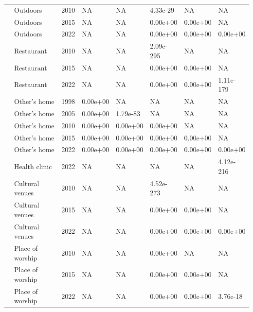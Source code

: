 \documentclass[preprint, 3p,
authoryear]{elsarticle} %
\begin{document}
\begin{table}
{\begin{tabular}[t]{llllllll}
 & Outdoors & 2010 & NA & NA & 4.33e-29 & NA & NA\\

 & Outdoors & 2015 & NA & NA & 0.00e+00 & 0.00e+00 & NA\\

 & Outdoors & 2022 & NA & NA & 0.00e+00 & 0.00e+00 & 0.00e+00\\

 & Restaurant & 2010 & NA & NA & 2.09e-295 & NA & NA\\

 & Restaurant & 2015 & NA & NA & 0.00e+00 & 0.00e+00 & NA\\

 & Restaurant & 2022 & NA & NA & 0.00e+00 & 0.00e+00 & 1.11e-179\\

 & Other's home & 1998 & 0.00e+00 & NA & NA & NA & NA\\

 & Other's home & 2005 & 0.00e+00 & 1.79e-83 & NA & NA & NA\\

 & Other's home & 2010 & 0.00e+00 & 0.00e+00 & 0.00e+00 & NA & NA\\

 & Other's home & 2015 & 0.00e+00 & 0.00e+00 & 0.00e+00 & 0.00e+00 & NA\\

 & Other's home & 2022 & 0.00e+00 & 0.00e+00 & 0.00e+00 & 0.00e+00 & 0.00e+00\\

 & Health clinic & 2022 & NA & NA & NA & NA & 4.12e-216\\

 & Cultural venues & 2010 & NA & NA & 4.52e-273 & NA & NA\\

 & Cultural venues & 2015 & NA & NA & 0.00e+00 & 0.00e+00 & NA\\

 & Cultural venues & 2022 & NA & NA & 0.00e+00 & 0.00e+00 & 0.00e+00\\

 & Place of worship & 2010 & NA & NA & 0.00e+00 & NA & NA\\

 & Place of worship & 2015 & NA & NA & 0.00e+00 & 0.00e+00 & NA\\

 & Place of worship & 2022 & NA & NA & 0.00e+00 & 0.00e+00 & 3.76e-18\\


\end{tabular}}
\end{table}
\end{document}
